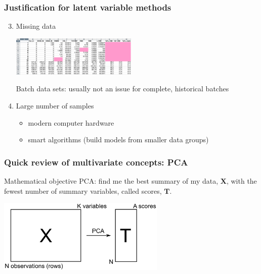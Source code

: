 \documentclass[handout, 12pt]{beamer}
\begin{document}
\begin{frame}\frametitle{Justification for latent variable methods}

\begin{enumerate}
	\setcounter{enumi}{2}
	\item	Missing data
	
			\begin{center}
				\includegraphics[width=6cm]{images/missing-data.png}
			\end{center}
			
			Batch data sets: usually not an issue for complete, historical batches			
			
	
	\item	Large number of samples
	
			\begin{itemize}
				\item	modern computer hardware
				
				\item	smart algorithms (build models from smaller data groups)
			\end{itemize} 
\end{enumerate}
\end{frame}

\begin{frame}\frametitle{Quick review of multivariate concepts: PCA}

	\begin{block}{Mathematical objective}
		PCA: find me the best summary of my data, \( \mathbf{X} \), with the fewest number of summary variables, called scores, \( \mathbf{T} \).
	\end{block}
	
	\vspace{18pt}

	\begin{center}
		\includegraphics[width=8cm]{images/reduce-data-X-to-scores-T.png}
	\end{center}
	
\end{frame}
\end{document}
